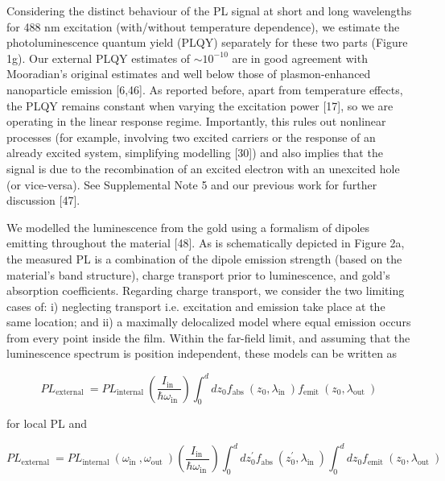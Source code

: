 \documentclass[10pt]{article}
\begin{document}
Considering the distinct behaviour of the PL signal at short and long wavelengths for 488 nm excitation (with/without temperature dependence), we estimate the photoluminescence quantum yield (PLQY) separately for these two parts (Figure 1g). Our external PLQY estimates of $\sim 10^{-10}$ are in good agreement with Mooradian's original estimates and well below those of plasmon-enhanced nanoparticle emission [6,46]. As reported before, apart from temperature effects, the PLQY remains constant when varying the excitation power [17], so we are operating in the linear response regime. Importantly, this rules out nonlinear processes (for example, involving two excited carriers or the response of an already excited system, simplifying modelling [30]) and also implies that the signal is due to the recombination of an excited electron with an unexcited hole (or vice-versa). See Supplemental Note 5 and our previous work for further discussion [47].

We modelled the luminescence from the gold using a formalism of dipoles emitting throughout the material [48]. As is schematically depicted in Figure 2a, the measured PL is a combination of the dipole emission strength (based on the material's band structure), charge transport prior to luminescence, and gold's absorption coefficients. Regarding charge transport, we consider the two limiting cases of: i) neglecting transport i.e. excitation and emission take place at the same location; and ii) a maximally delocalized model where equal emission occurs from every point inside the film. Within the far-field limit, and assuming that the luminescence spectrum is position independent, these models can be written as


\begin{equation*}
P L_{\text {external }}=P L_{\text {internal }}\left(\frac{I_{\text {in }}}{\hbar \omega_{\text {in }}}\right) \int_{0}^{d} d z_{0} f_{\text {abs }}\left(z_{0}, \lambda_{\text {in }}\right) f_{\text {emit }}\left(z_{0}, \lambda_{\text {out }}\right) \tag{1a}
\end{equation*}


for local PL and


\begin{equation*}
P L_{\text {external }}=P L_{\text {internal }}\left(\omega_{\text {in }}, \omega_{\text {out }}\right)\left(\frac{I_{\text {in }}}{\hbar \omega_{\text {in }}}\right) \int_{0}^{d} d z_{0}^{\prime} f_{\text {abs }}\left(z_{0}^{\prime}, \lambda_{\text {in }}\right) \int_{0}^{d} d z_{0} f_{\text {emit }}\left(z_{0}, \lambda_{\text {out }}\right) \tag{1b}
\end{equation*}
\end{document}
